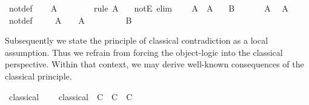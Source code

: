 \begin{isabellebody}
%
\isadelimproof
%
\endisadelimproof
%
\isatagproof
{}\isamarkupfalse%
\ not{\isacharunderscore}def\isanewline
{}\isamarkupfalse%
\isanewline
\ \ \isamarkupfalse%
\ A\isanewline
\ \ \isamarkupfalse%
\ \isamarkupfalse%
\ {\isasymbottom}\ \isamarkupfalse%
\ {\isacharparenleft}rule\ {\isacharbackquoteopen}A\ {\isasymLongrightarrow}\ {\isasymbottom}{\isacharbackquoteclose}{\isacharparenright}\isanewline
{}\isamarkupfalse%
%
\endisatagproof
{\isafoldproof}%
%
\isadelimproof
\isanewline
%
\endisadelimproof
\isanewline
{}\isamarkupfalse%
\ notE\ {\isacharbrackleft}elim{\isacharbrackright}{\isacharcolon}\isanewline
\ \ \ {\isachardoublequoteopen}{\isasymnot}\ A{\isachardoublequoteclose}\ \ A\isanewline
\ \ \ B\isanewline
%
\isadelimproof
%
\endisadelimproof
%
\isatagproof
{}\isamarkupfalse%
\ {\isacharminus}\isanewline
\ \ \isamarkupfalse%
\ {\isacharbackquoteopen}{\isasymnot}\ A{\isacharbackquoteclose}\ \isamarkupfalse%
\ {\isachardoublequoteopen}A\ {\isasymlongrightarrow}\ {\isasymbottom}{\isachardoublequoteclose}\ \isamarkupfalse%
\ not{\isacharunderscore}def\ \isacommand{{\isachardot}}\isamarkupfalse%
\isanewline
\ \ \isamarkupfalse%
\ {\isacharbackquoteopen}A\ {\isasymlongrightarrow}\ {\isasymbottom}{\isacharbackquoteclose}\ \ {\isacharbackquoteopen}A{\isacharbackquoteclose}\ \isamarkupfalse%
\ {\isasymbottom}\ \isacommand{{\isachardot}{\isachardot}}\isamarkupfalse%
\isanewline
\ \ \isamarkupfalse%
\ \isamarkupfalse%
\ B\ \isacommand{{\isachardot}{\isachardot}}\isamarkupfalse%
\isanewline
{}\isamarkupfalse%
%
\endisatagproof
{\isafoldproof}%
%
\isadelimproof
%
\endisadelimproof
%
\isamarkuptrue%
%
\begin{isamarkuptext}%
Subsequently we state the principle of classical contradiction as a
  local assumption.  Thus we refrain from forcing the object-logic
  into the classical perspective.  Within that context, we may derive
  well-known consequences of the classical principle.%
\end{isamarkuptext}%
\isamarkuptrue%
\isamarkupfalse%
\ classical\ {\isacharequal}\isanewline
\ \ \ classical{\isacharcolon}\ {\isachardoublequoteopen}{\isacharparenleft}{\isasymnot}\ C\ {\isasymLongrightarrow}\ C{\isacharparenright}\ {\isasymLongrightarrow}\ C{\isachardoublequoteclose}\isanewline

\end{isabellebody}
